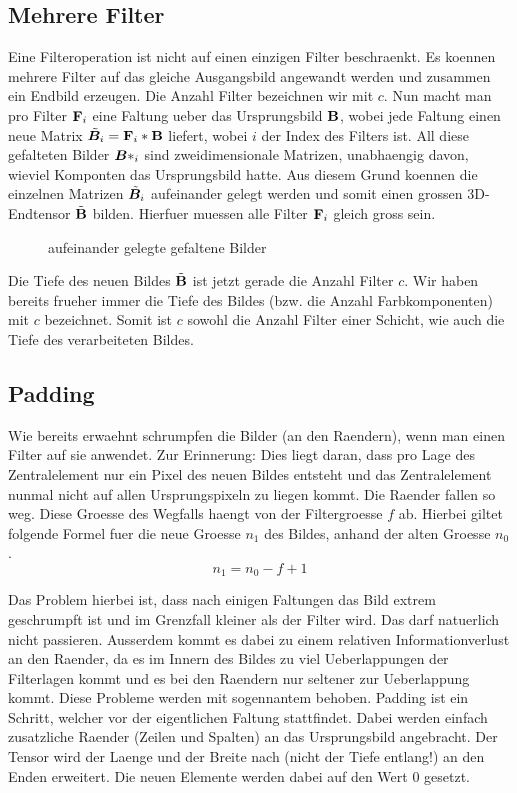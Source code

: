 \subsection{Mehrere Filter}
Eine Filteroperation ist nicht auf einen einzigen Filter beschraenkt. Es koennen
mehrere Filter auf das gleiche Ausgangsbild angewandt werden und zusammen ein
Endbild erzeugen.
\para{}
Die Anzahl Filter bezeichnen wir mit $c$.
Nun macht man pro Filter $\mathbf{F}_i$ eine Faltung ueber das Ursprungsbild $\mathbf{B}$, wobei
jede Faltung einen neue Matrix $\tilde{\bm{B}}_i = \mathbf{F}_i * \mathbf{B}$ liefert, wobei $i$ der Index des
Filters ist. All diese gefalteten Bilder $\bm{B}*_i$ sind zweidimensionale Matrizen, unabhaengig davon, wieviel
Komponten das Ursprungsbild hatte. Aus diesem Grund koennen die einzelnen
Matrizen $\tilde{\bm{B}}_i$ aufeinander gelegt werden und somit einen grossen 3D-Endtensor
$\tilde{\mathbf{B}}$ bilden.
Hierfuer muessen alle Filter $\mathbf{F}_i$ gleich gross sein.
\begin{figure}[h!]
  \caption{aufeinander gelegte gefaltene Bilder}

\end{figure}
Die Tiefe des neuen Bildes $\tilde{\mathbf{B}}$ ist jetzt gerade die Anzahl Filter $c$.
Wir haben bereits frueher immer die Tiefe des Bildes (bzw. die Anzahl
Farbkomponenten) mit $c$ bezeichnet. Somit ist $c$ sowohl die Anzahl Filter
einer Schicht, wie auch die Tiefe des verarbeiteten Bildes.

\subsection{Padding}
Wie bereits erwaehnt schrumpfen die Bilder (an den Raendern), wenn man einen Filter auf sie anwendet.
Zur Erinnerung: Dies liegt daran, dass pro Lage des Zentralelement nur ein Pixel
des neuen Bildes entsteht und das Zentralelement nunmal nicht auf allen
Ursprungspixeln zu liegen kommt. Die Raender fallen so weg. Diese Groesse des
Wegfalls haengt von der Filtergroesse $f$ ab. Hierbei giltet folgende Formel fuer die
neue Groesse $n_1$ des Bildes, anhand der alten Groesse $n_0$.
\begin{equation}
  n_1 = n_0 - f + 1
\end{equation}

Das Problem hierbei ist, dass nach einigen Faltungen das Bild extrem geschrumpft
ist und im Grenzfall kleiner als der Filter wird. Das darf natuerlich nicht
passieren. Ausserdem kommt es dabei zu einem relativen Informationverlust an den Raender, da es im
Innern des Bildes zu viel Ueberlappungen der Filterlagen kommt und es bei den
Raendern nur seltener zur Ueberlappung kommt.
\para{}
Diese Probleme werden mit sogennantem  behoben. Padding ist ein
Schritt, welcher vor der eigentlichen Faltung stattfindet. Dabei werden einfach
zusatzliche Raender (Zeilen und Spalten) an das Ursprungsbild angebracht. Der
Tensor wird der Laenge und der Breite nach (nicht der Tiefe entlang!) an den Enden erweitert. Die neuen Elemente werden dabei auf den Wert
$0$ gesetzt.

